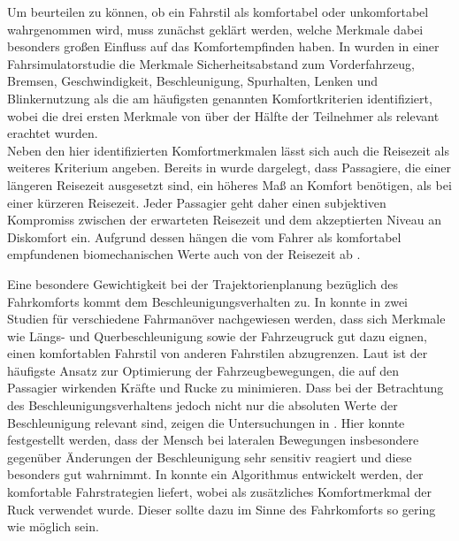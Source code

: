 Um beurteilen zu können, ob ein Fahrstil als komfortabel oder unkomfortabel wahrgenommen wird, muss zunächst geklärt werden, welche Merkmale dabei besonders großen Einfluss auf das Komfortempfinden haben. In \cite{scherer} wurden in einer Fahrsimulatorstudie die Merkmale Sicherheitsabstand zum Vorderfahrzeug, Bremsen, Geschwindigkeit, Beschleunigung, Spurhalten, Lenken und Blinkernutzung als die am häufigsten genannten Komfortkriterien identifiziert, wobei die drei ersten Merkmale von über der Hälfte der Teilnehmer als relevant erachtet wurden.\\
Neben den hier identifizierten Komfortmerkmalen lässt sich auch die Reisezeit als weiteres Kriterium angeben. Bereits in \cite{oborne}\cite{Oborne.1978} wurde dargelegt, dass Passagiere, die einer längeren Reisezeit ausgesetzt sind, ein höheres Maß an Komfort benötigen, als bei einer kürzeren Reisezeit. Jeder Passagier geht daher einen subjektiven Kompromiss zwischen der erwarteten Reisezeit und dem akzeptierten Niveau an Diskomfort ein. Aufgrund dessen hängen die vom Fahrer als komfortabel empfundenen biomechanischen Werte auch von der Reisezeit ab \cite{Festner.2019}.

Eine besondere Gewichtigkeit bei der Trajektorienplanung bezüglich des Fahrkomforts kommt dem Beschleunigungsverhalten zu. In \cite{Bellem}\cite{Bellem.2016} konnte in zwei Studien für verschiedene Fahrmanöver nachgewiesen werden, dass sich Merkmale wie Längs- und Querbeschleunigung sowie der Fahrzeugruck gut dazu eignen, einen komfortablen Fahrstil von anderen Fahrstilen abzugrenzen. Laut \cite{elbanhawi}\cite{Elbanhawi.2015} ist der häufigste Ansatz zur Optimierung der Fahrzeugbewegungen, die auf den Passagier wirkenden Kräfte und Rucke zu minimieren. Dass bei der Betrachtung des Beschleunigungsverhaltens jedoch nicht nur die absoluten Werte der Beschleunigung relevant sind, zeigen die Untersuchungen in \cite{gianna}\cite{Gianna.1996}. Hier konnte festgestellt werden, dass der Mensch bei lateralen Bewegungen insbesondere gegenüber Änderungen der Beschleunigung sehr sensitiv reagiert und diese besonders gut wahrnimmt. In \cite{dovgan} konnte ein Algorithmus entwickelt werden, der komfortable Fahrstrategien liefert, wobei als zusätzliches Komfortmerkmal der Ruck verwendet wurde. Dieser sollte dazu im Sinne des Fahrkomforts so gering wie möglich sein.

